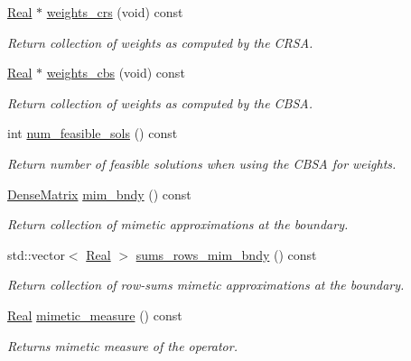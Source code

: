 \begin{DoxyCompactItemize}
\hyperlink{group__c01-roots_gac080bbbf5cbb5502c9f00405f894857d}{Real} $\ast$ \hyperlink{classmtk_1_1Div1D_ab5c791285e7e51a85b8c62a1b0ab9126}{weights\+\_\+crs} (void) const 
\begin{DoxyCompactList}\small\item\em Return collection of weights as computed by the C\+R\+S\+A. \end{DoxyCompactList}\item 
\hyperlink{group__c01-roots_gac080bbbf5cbb5502c9f00405f894857d}{Real} $\ast$ \hyperlink{classmtk_1_1Div1D_a5d4fe8c61ce41cb1134a3f9cb16deb59}{weights\+\_\+cbs} (void) const 
\begin{DoxyCompactList}\small\item\em Return collection of weights as computed by the C\+B\+S\+A. \end{DoxyCompactList}\item 
int \hyperlink{classmtk_1_1Div1D_a033d486957071e6addf1d2d4d5dc95cc}{num\+\_\+feasible\+\_\+sols} () const 
\begin{DoxyCompactList}\small\item\em Return number of feasible solutions when using the C\+B\+S\+A for weights. \end{DoxyCompactList}\item 
\hyperlink{classmtk_1_1DenseMatrix}{Dense\+Matrix} \hyperlink{classmtk_1_1Div1D_a2c844ef39825e73e4024d35fcdd42b12}{mim\+\_\+bndy} () const 
\begin{DoxyCompactList}\small\item\em Return collection of mimetic approximations at the boundary. \end{DoxyCompactList}\item 
std\+::vector$<$ \hyperlink{group__c01-roots_gac080bbbf5cbb5502c9f00405f894857d}{Real} $>$ \hyperlink{classmtk_1_1Div1D_a8c611354217cb15cdb41c23b067fb398}{sums\+\_\+rows\+\_\+mim\+\_\+bndy} () const 
\begin{DoxyCompactList}\small\item\em Return collection of row-\/sums mimetic approximations at the boundary. \end{DoxyCompactList}\item 
\hyperlink{group__c01-roots_gac080bbbf5cbb5502c9f00405f894857d}{Real} \hyperlink{classmtk_1_1Div1D_a00caf61168e7b4b14b488eab0fe08ee4}{mimetic\+\_\+measure} () const 
\begin{DoxyCompactList}\small\item\em Returns mimetic measure of the operator. \end{DoxyCompactList}\item 

\end{DoxyCompactItemize}
